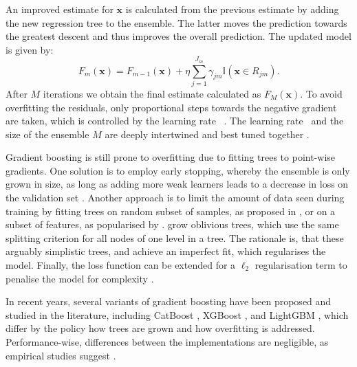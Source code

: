 An improved estimate for $\mathbf{x}$ is calculated from the previous estimate by adding the new regression tree to the ensemble. The latter moves the prediction towards the greatest descent and thus improves the overall prediction. The updated model is given by:
\begin{equation}
    F_{m}(\mathbf{x})=F_{m-1}(\mathbf{x})+\eta \sum_{j=1}^{J_{m}} \gamma_{j m} \mathbb{I}\left(\mathbf{x} \in R_{j m}\right).
\end{equation}
After $M$ iterations we obtain the final estimate calculated as $F_{M}\left(\mathbf{x}\right)$. To avoid \gls{overfitting} the residuals, only proportional steps towards the negative gradient are taken, which is controlled by the learning rate \eta~\autocite[][13]{friedmanGreedyFunctionApproximation2001}. The learning rate \eta~and the size of the ensemble $M$ are deeply intertwined and best tuned together \autocite[][13]{friedmanGreedyFunctionApproximation2001}.

Gradient boosting is still prone to \gls{overfitting} due to fitting trees to point-wise gradients. One solution is to employ early stopping, whereby the ensemble is only grown in size, as long as adding more weak learners leads to a decrease in loss on the validation set \autocite[][384]{hastietrevorElementsStatisticalLearning2009}. Another approach is to limit the amount of data seen during training by fitting trees on random subset of samples, as proposed in \textcite[][3]{friedmanStochasticGradientBoosting2002}, or on a subset of features, as popularised by \textcite[][3]{chenXGBoostScalableTree2016}. \textcite[][6]{prokhorenkovaCatBoostUnbiasedBoosting2018} grow oblivious trees, which use the same splitting criterion for all nodes of one level in a tree. The rationale is, that these arguably simplistic trees, and achieve an imperfect fit, which regularises the model. Finally, the loss function can be extended for a $\ell_2$ regularisation term to penalise the model for complexity \autocite[][2]{chenXGBoostScalableTree2016}.

In recent years, several variants of gradient boosting have been proposed and studied in the literature, including CatBoost \autocite[][1--23]{prokhorenkovaCatBoostUnbiasedBoosting2018}, XGBoost \autocite[][1--13]{chenXGBoostScalableTree2016}, and LightGBM \autocite[][3]{keLightGBMHighlyEfficient2017}, which differ by the policy how trees are grown and how \gls{overfitting} is addressed. Performance-wise, differences between the implementations are negligible, as empirical studies suggest \autocites[][8]{grinsztajnWhyTreebasedModels2022}[][19--20]{gorishniyRevisitingDeepLearning2021}[][7]{somepalliSaintImprovedNeural2021}[][14]{borisovDeepNeuralNetworks2022}.

